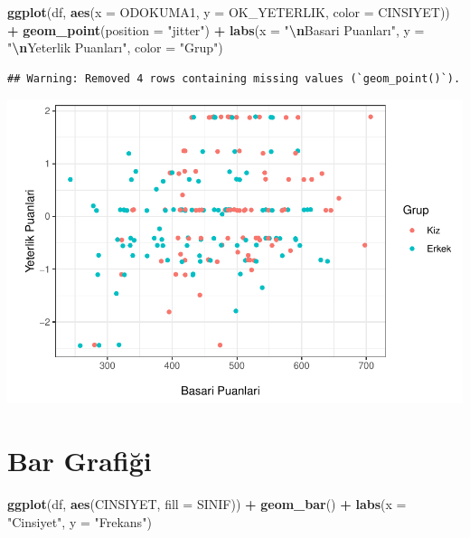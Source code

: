 \documentclass[
  oneside]{book}
\newenvironment{Shaded}{\begin{snugshade}}{\end{snugshade}}
\newcommand{\AttributeTok}[1]{\textcolor[rgb]{0.13,0.29,0.53}{#1}}
\newcommand{\FunctionTok}[1]{\textcolor[rgb]{0.13,0.29,0.53}{\textbf{#1}}}
\newcommand{\NormalTok}[1]{#1}
\newcommand{\SpecialCharTok}[1]{\textcolor[rgb]{0.81,0.36,0.00}{\textbf{#1}}}
\newcommand{\StringTok}[1]{\textcolor[rgb]{0.31,0.60,0.02}{#1}}
\begin{document}
\begin{Shaded}
\begin{Highlighting}[]
\FunctionTok{ggplot}\NormalTok{(df, }\FunctionTok{aes}\NormalTok{(}\AttributeTok{x =}\NormalTok{ ODOKUMA1,}
\AttributeTok{y =}\NormalTok{ OK\_YETERLIK,}
\AttributeTok{color =}\NormalTok{ CINSIYET)) }\SpecialCharTok{+}
\FunctionTok{geom\_point}\NormalTok{(}\AttributeTok{position =} \StringTok{"jitter"}\NormalTok{) }\SpecialCharTok{+}
  \FunctionTok{labs}\NormalTok{(}\AttributeTok{x =} \StringTok{"}\SpecialCharTok{\textbackslash{}n}\StringTok{Basari Puanları"}\NormalTok{,}
       \AttributeTok{y =} \StringTok{"}\SpecialCharTok{\textbackslash{}n}\StringTok{Yeterlik Puanları"}\NormalTok{,}
       \AttributeTok{color =} \StringTok{"Grup"}\NormalTok{)}
\end{Highlighting}
\end{Shaded}

\begin{verbatim}
## Warning: Removed 4 rows containing missing values (`geom_point()`).
\end{verbatim}

\begin{center}\includegraphics[width=1\linewidth]{15-betimleyici-istatistik_files/figure-latex/unnamed-chunk-55-1} \end{center}

\hypertarget{bar-grafiux11fi}{%
\section{Bar Grafiği}\label{bar-grafiux11fi}}

\begin{Shaded}
\begin{Highlighting}[]
\FunctionTok{ggplot}\NormalTok{(df, }\FunctionTok{aes}\NormalTok{(CINSIYET, }\AttributeTok{fill =}\NormalTok{ SINIF)) }\SpecialCharTok{+}   \FunctionTok{geom\_bar}\NormalTok{() }\SpecialCharTok{+}
  \FunctionTok{labs}\NormalTok{(}\AttributeTok{x =} \StringTok{"Cinsiyet"}\NormalTok{,}
       \AttributeTok{y =} \StringTok{"Frekans"}\NormalTok{)}
\end{Highlighting}
\end{Shaded}
\end{document}
